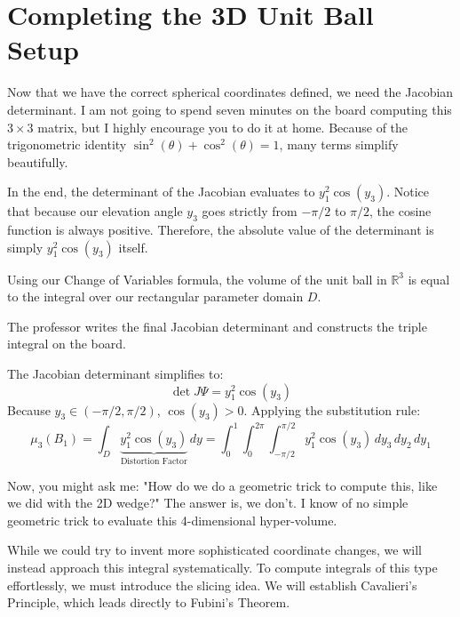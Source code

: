 \setcounter{section}{4} %

\section{Completing the 3D Unit Ball Setup}

\begin{spoken_clean}[00:32:53 - 00:36:10]
Now that we have the correct spherical coordinates defined, we need the Jacobian determinant. I am not going to spend seven minutes on the board computing this $3 \times 3$ matrix, but I highly encourage you to do it at home. Because of the trigonometric identity $\sin^2(\theta) + \cos^2(\theta) = 1$, many terms simplify beautifully.

In the end, the determinant of the Jacobian evaluates to $y_1^2 \cos(y_3)$. Notice that because our elevation angle $y_3$ goes strictly from $-\pi/2$ to $\pi/2$, the cosine function is always positive. Therefore, the absolute value of the determinant is simply $y_1^2 \cos(y_3)$ itself.

Using our Change of Variables formula, the volume of the unit ball in $\mathbb{R}^3$ is equal to the integral over our rectangular parameter domain $D$.
\end{spoken_clean}

\begin{nice-box}
The professor writes the final Jacobian determinant and constructs the triple integral on the board.
\end{nice-box}

\begin{math_stroke}
The Jacobian determinant simplifies to:
\[
\det J\Psi = y_1^2 \cos(y_3)
\]
Because $y_3 \in (-\pi/2, \pi/2)$, $\cos(y_3) > 0$. Applying the substitution rule:
\begin{equation} \label{eq:ball_3d_integral}
\mu_3(B_1) = \int_{D} \underbrace{y_1^2 \cos(y_3)}_{\text{Distortion Factor}} \, dy = \int_0^1 \int_0^{2\pi} \int_{-\pi/2}^{\pi/2} y_1^2 \cos(y_3) \, dy_3 \, dy_2 \, dy_1
\end{equation}
\end{math_stroke}

\begin{spoken_clean}[00:36:10 - 00:40:07]
Now, you might ask me: "How do we do a geometric trick to compute this, like we did with the 2D wedge?" The answer is, we don't. I know of no simple geometric trick to evaluate this 4-dimensional hyper-volume. 

While we could try to invent more sophisticated coordinate changes, we will instead approach this integral systematically. To compute integrals of this type effortlessly, we must introduce the slicing idea. We will establish Cavalieri's Principle, which leads directly to Fubini's Theorem.
\end{spoken_clean}

